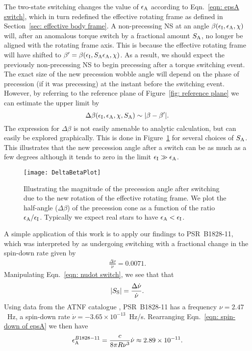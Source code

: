 \documentclass[../full_thesis/full_thesis.tex]{subfiles}
\begin{document}
The two-state switching changes the value of $\epsilon_{\mathrm{A}}$ according to
Eqn.~\eqref{eqn: epsA switch}, which in turn redefined the effective rotating frame
as defined in Section~\ref{sec: effective body frame}. A non-precessing NS at an
angle $\beta(\epsilon_{\mathrm{I}}, \epsilon_{\mathrm{A}}, \chi)$ will, after an anomalous torque switch by a fractional
amount $S_{\mathrm{A}}$, no longer be aligned with the rotating frame axis. This is
because the effective rotating frame will have shifted to $\beta' = \beta(\epsilon_{\mathrm{I}},
S_{\mathrm{A}}\epsilon_{\mathrm{A}}, \chi)$. As a result, we should expect the previously
non-precessing NS to begin precessing after a torque switching event.
The exact size of the new precession wobble angle will depend on the phase of
precession (if it was precessing) at the instant before the switching event.
However, by referring to the reference plane of Figure~\ref{fig: reference plane}
we can estimate the upper limit by
\begin{equation}
    \Delta\beta(\epsilon_{\mathrm{I}}, \epsilon_{\mathrm{A}}, \chi, S_{\mathrm{A}}) \sim |\beta - \beta'|.
\end{equation}
The expression for $\Delta \beta$ is
not easily amenable to analytic calculation, but can easily be explored
graphically.  This is done in Figure~\ref{fig: DeltaBetaPlot} for several choices
of $S_{\mathrm{A}}$. This illustrates that the new precession angle after a switch can be
as much as a few degrees although it tends to zero in the limit $\epsilon_{\mathrm{I}} \gg
\epsilon_{\mathrm{A}}$.
\begin{figure}[htb]
    \centering
    \texttt{[image: DeltaBetaPlot]}
    \caption{Illustrating the magnitude of the precession angle after switching
        due to the new rotation of the effective rotating frame. We plot the half-angle
        ($\Delta\beta$) of the precession cone as a function of the ratio
    $\epsilon_{\mathrm{A}}/\epsilon_{\mathrm{I}}$. Typically we expect real stars to have $\epsilon_{\mathrm{A}} < \epsilon_{\mathrm{I}}$.}
    \label{fig: DeltaBetaPlot}
\end{figure}

A simple application of this work is to apply our findings to PSR~B1828-11,
which was interpreted by \citet{Lyne2010} as undergoing switching with a fractional
change in the spin-down rate given by
\begin{align}
\frac{\Delta\dot{\nu}}{\dot{\nu}} = 0.0071.
\end{align}
Manipulating Eqn.~\eqref{eqn: nudot switch}, we see that that
\begin{align}
|S_{\mathrm{S}}| = \frac{\Delta\dot{\nu}}{\dot{\nu}}.
\end{align}
Using data from the ATNF catalogue \citep{ATNF}, PSR~B1828-11 has a frequency
$\nu = 2.47$~Hz, a spin-down rate $\dot{\nu}=-3.65\times10^{-13}$~Hz/s.
Rearranging Eqn.~\ref{eqn: spin-down of epsA} we then have
\begin{align}
\epsilon_{\mathrm{A}}^{B1828-11} = \frac{c}{8\pi R\nu^{3}}\dot{\nu} \approx 2.89 \times 10^{-11}.
\end{align}
\end{document}
